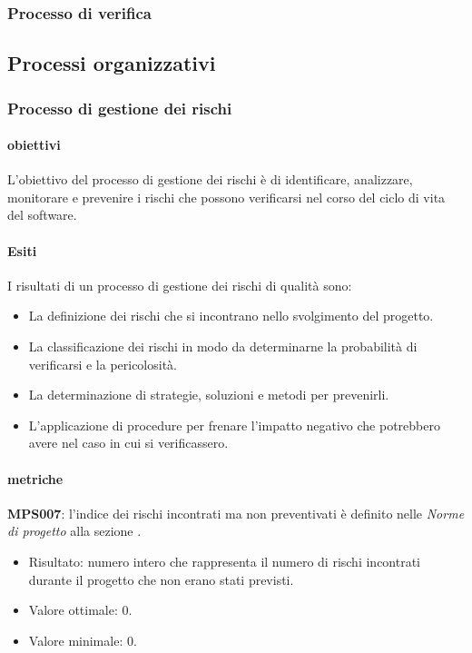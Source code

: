 \documentclass[../piano-di-qualifica.tex]{subfiles}
\begin{document}
\subsubsection{Processo di verifica}%
\label{subs:processo_di_verifica}

\subsection{Processi organizzativi}%
\label{sub:processi_organizzativi}

\subsubsection{Processo di gestione dei rischi}%
\label{sub:processo_di_gestione_dei_rischi}

\paragraph{obiettivi}
\label{par:obiettivi}

L'obiettivo del processo di gestione dei rischi è di identificare, analizzare, monitorare e prevenire i rischi che possono verificarsi nel corso del ciclo di vita del software.

\paragraph{Esiti}
\label{par:esiti}

I risultati di un processo di gestione dei rischi di qualità sono:
\begin{itemize}
  \item La definizione dei rischi che si incontrano nello svolgimento del progetto.
  \item La classificazione dei rischi in modo da determinarne la probabilità di verificarsi e la pericolosità.
    \item La determinazione di strategie, soluzioni e metodi per prevenirli.
    \item L'applicazione di procedure per frenare l'impatto negativo che potrebbero avere nel caso in cui si verificassero.
\end{itemize}

\paragraph{metriche}%
\label{par:metriche}

\textbf{MPS007}: l'indice dei rischi incontrati ma non preventivati è definito nelle \textit{Norme di progetto} alla sezione .
\begin{itemize}
  \item Risultato: numero intero che rappresenta il numero di rischi incontrati durante il progetto che non erano stati previsti.
  \item Valore ottimale: 0.
  \item Valore minimale: 0.
\end{itemize}
\end{document}
